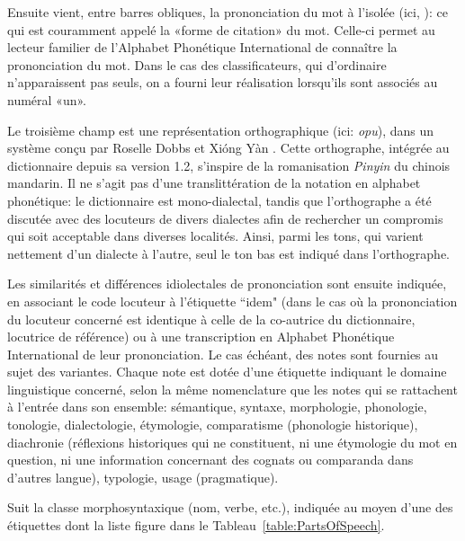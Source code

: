 Ensuite vient, entre barres obliques, la prononciation du mot à l’isolée (ici, ): ce qui est couramment appelé la «forme de citation» du mot. Celle-ci permet au lecteur familier de l’Alphabet Phonétique International de connaître la prononciation du mot. Dans le cas des classificateurs, qui d’ordinaire n’apparaissent pas seuls, on a fourni leur réalisation lorsqu’ils sont associés au numéral «un».

Le troisième champ est une représentation orthographique (ici: \emph{opu}), dans un système conçu par Roselle Dobbs et Xióng Yàn \parencite[]{dobbs_ortho_2018}. Cette orthographe, intégrée au dictionnaire depuis sa version 1.2, s’inspire de la romanisation \emph{Pinyin} du chinois mandarin. Il ne s’agit pas d’une translittération de la notation en alphabet phonétique: le dictionnaire est mono-dialectal, tandis que l’orthographe a été discutée avec des locuteurs de divers dialectes afin de rechercher un compromis qui soit acceptable dans diverses localités. Ainsi, parmi les tons, qui varient nettement d’un dialecte à l’autre, seul le ton bas est indiqué dans l’orthographe.

Les similarités et différences idiolectales de prononciation sont ensuite indiquée, en associant le code locuteur à l'étiquette ``idem" (dans le cas où la prononciation du locuteur concerné est identique à celle de la co-autrice du dictionnaire, locutrice de référence) ou à une transcription en Alphabet Phonétique International de leur prononciation. Le cas échéant, des notes sont fournies au sujet des variantes. Chaque note est dotée d'une étiquette indiquant le domaine linguistique concerné, selon la même nomenclature que les notes qui se rattachent à l'entrée dans son ensemble: sémantique, syntaxe, morphologie, phonologie, tonologie, dialectologie, étymologie, comparatisme (phonologie historique), diachronie (réflexions historiques qui ne constituent, ni une étymologie du mot en question, ni une information concernant des cognats ou comparanda dans d’autres langue), typologie, usage (pragmatique).

Suit la classe morphosyntaxique (nom, verbe, etc.), indiquée au moyen d'une des étiquettes dont la liste figure dans le Tableau~\ref{table:PartsOfSpeech}.


